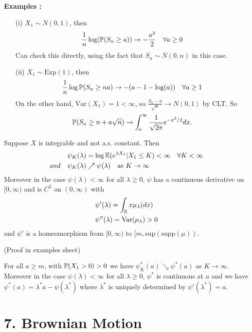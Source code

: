 \documentclass[10pt,a4paper]{report}
\begin{document}
\textbf{Examples :}
\begin{itemize}
\item[(i)] $X_1 \sim N(0,1)$, then
\begin{align*}
\frac{1}{n} \log (\mathbb{P}(S_n \geq a)) \rightarrow -\frac{a^2}{2} \quad \forall a\geq 0
\end{align*}
Can check this directly, using the fact that $S_n \sim N(0,n)$ in this case.
\item[(ii)] $X_1 \sim \text{Exp}(1)$, then
\begin{align*}
\frac{1}{n} \log \mathbb{P}(S_n \geq na) \rightarrow -(a-1-\log (a)) \quad \forall a\geq 1
\end{align*}
On the other hand, $\text{Var}(X_1) =1 <\infty$, so $\frac{S_n -n}{\sqrt{n}} \rightarrow N(0,1)$ by CLT. So
\begin{align*}
\mathbb{P}(S_n \geq n + a\sqrt{n}) \rightarrow \int_a^{\infty} \frac{1}{\sqrt{2\pi}} e^{-x^2/2} dx.
\end{align*}
\end{itemize}
\s

 Suppose $X$ is integrable and not a.s. constant. Then 
\begin{align*}
& \psi_K(\lambda) = \log \mathbb{E}(e^{\lambda X_1}|X_1 \leq K) < \infty \quad \forall K < \infty \\
\text{\emph{and}} \quad & \psi_K(\lambda) \nearrow \psi(\lambda) \quad \text{as } K\rightarrow \infty
\end{align*}
Moreover in the case $\psi(\lambda) < \infty$ for all $\lambda \geq 0$, $\psi$ has a continuous derivative on $[0,\infty)$ and is $C^2$ on $(0,\infty)$ with
\begin{align*}
& \psi'(\lambda) = \int_{\mathbb{R}} x\mu_{\lambda}(dx) \\
& \psi''(\lambda) = \text{Var}(\mu_{\lambda}) > 0
\end{align*}
and $\psi'$ is a homeomorphism from $[0,\infty)$ to $[m, \text{sup}(\text{supp}(\mu))$.

(Proof in examples sheet)
\s

 For all $a\geq m$, with $\mathbb{P}(X_1 > 0) > 0$ we have $\psi^*_K(a) \searrow \psi^*(a)$ as $K\rightarrow \infty$. Moreover in the case $\psi(\lambda) < \infty$ for all $\lambda \geq 0$, $\psi^*$ is continuous at $a$ and we have $\psi^*(a) =\lambda^* a - \psi(\lambda^*)$ where $\lambda^*$ is uniquely determined by $\psi'(\lambda^*) = a$.

\section*{7. Brownian Motion}
\end{document}
